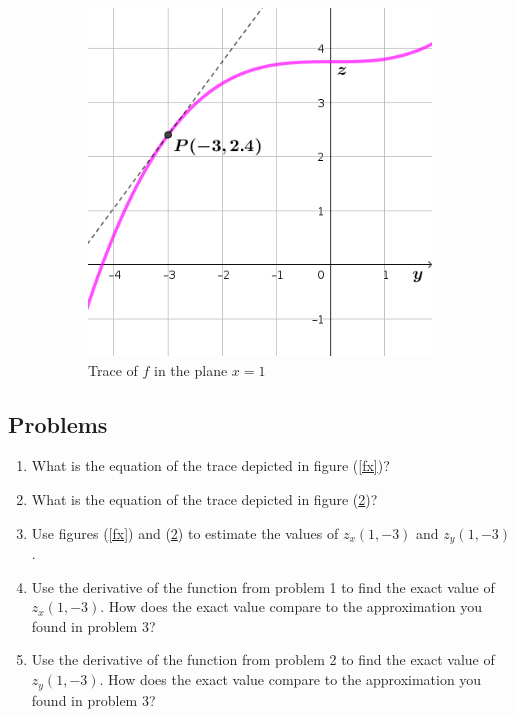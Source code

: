 \documentclass[13pt,letterpaper,fleqn]{article}
\begin{document}
\begin{figure}[ht!]
\begin{subfigure}[t]{0.33\textwidth}
  \includegraphics[width=0.8\linewidth]{img/cubic_trace.png}
  \caption{Trace of $f$ in the plane $x=1$}
  \label{fy}
 \end{subfigure}
 \caption*{}
\end{figure}%
\subsection*{Problems}
\begin{enumerate}
 \item What is the equation of the trace depicted in figure (\ref{fx})?
 \item What is the equation of the trace depicted in figure (\ref{fy})?
 \item Use figures (\ref{fx}) and (\ref{fy}) to estimate the values of $z_x(1,-3)$ and $z_y(1,-3)$.
 \item Use the derivative of the function from problem 1 to find the exact value of $z_x(1,-3)$. How does the exact value compare to the approximation you found in problem 3?
 \item Use the derivative of the function from problem 2 to find the exact value of $z_y(1,-3)$. How does the exact value compare to the approximation you found in problem 3?
\end{enumerate}
\end{document}

